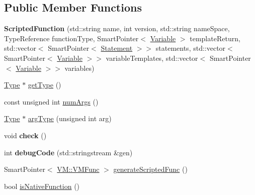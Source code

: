 \subsection*{Public Member Functions}
\begin{DoxyCompactItemize}
\item 
\hypertarget{class_scribble_core_1_1_scripted_function_abbf5f1e50cac1e11b2882ae4f0c38878}{{\bfseries Scripted\-Function} (std\-::string name, int version, std\-::string name\-Space, Type\-Reference function\-Type, Smart\-Pointer$<$ \hyperlink{class_scribble_core_1_1_variable}{Variable} $>$ template\-Return, std\-::vector$<$ Smart\-Pointer$<$ \hyperlink{class_scribble_core_1_1_statement}{Statement} $>$$>$ statements, std\-::vector$<$ Smart\-Pointer$<$ \hyperlink{class_scribble_core_1_1_variable}{Variable} $>$$>$ variable\-Templates, std\-::vector$<$ Smart\-Pointer$<$ \hyperlink{class_scribble_core_1_1_variable}{Variable} $>$$>$ variables)}\label{class_scribble_core_1_1_scripted_function_abbf5f1e50cac1e11b2882ae4f0c38878}

\item 
\hyperlink{class_scribble_core_1_1_type}{Type} $\ast$ \hyperlink{class_scribble_core_1_1_scripted_function_a17fdb48f024f25d425c55a4ee0aff5a3}{get\-Type} ()
\item 
const unsigned int \hyperlink{class_scribble_core_1_1_scripted_function_a43340a1cf723f2862124eef8d92039f7}{num\-Args} ()
\item 
\hyperlink{class_scribble_core_1_1_type}{Type} $\ast$ \hyperlink{class_scribble_core_1_1_scripted_function_a78f81df4187093a5e7bc94c6d57fd11e}{arg\-Type} (unsigned int arg)
\item 
\hypertarget{class_scribble_core_1_1_scripted_function_ae527084185cc034975bf61ec23c57ba9}{void {\bfseries check} ()}\label{class_scribble_core_1_1_scripted_function_ae527084185cc034975bf61ec23c57ba9}

\item 
\hypertarget{class_scribble_core_1_1_scripted_function_a7e5968b233124279a9a9ff4a6706bd41}{int {\bfseries debug\-Code} (std\-::stringstream \&gen)}\label{class_scribble_core_1_1_scripted_function_a7e5968b233124279a9a9ff4a6706bd41}

\item 
Smart\-Pointer$<$ \hyperlink{class_v_m_1_1_v_m_func}{V\-M\-::\-V\-M\-Func} $>$ \hyperlink{class_scribble_core_1_1_scripted_function_a80265e1d31e9e767fca0e365846251d4}{generate\-Scripted\-Func} ()
\item 
bool \hyperlink{class_scribble_core_1_1_scripted_function_a05fccc0cfe86d5efa8a19f7e5c3f6da0}{is\-Native\-Function} ()
\end{DoxyCompactItemize}
